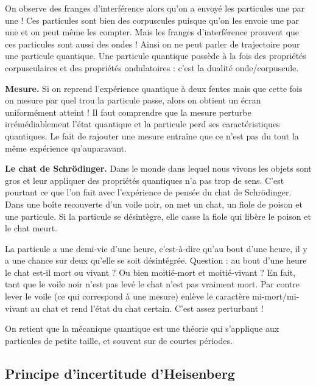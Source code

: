 \documentclass[11pt,class=report,crop=false]{standalone}
\begin{document}
On observe des franges d'interférence alors qu'on a envoyé les particules une par une !
Ces particules sont bien des corpuscules puisque qu'on les envoie une par une et on peut même les compter. Mais les franges d'interférence prouvent que ces particules sont aussi des ondes ! Ainsi on ne peut parler de trajectoire pour une particule quantique. Une particule quantique possède à la fois des propriétés corpusculaires et des propriétés ondulatoires : c'est la \og{}dualité onde/corpuscule\fg{}.

\bigskip

\textbf{Mesure.} 
Si on reprend l'expérience quantique à deux fentes mais que cette fois on mesure par quel trou la particule passe, alors on obtient un écran uniformément atteint !
Il faut comprendre que la mesure perturbe irrémédiablement l'état quantique et la particule perd ses caractéristiques quantiques. Le fait de rajouter une mesure entraîne que ce n'est pas du tout la même expérience qu'auparavant.


\bigskip

\textbf{Le chat de Schrödinger.}
Dans le monde dans lequel nous vivons les objets sont \og{}gros\fg{} et leur appliquer des propriétés quantiques n'a pas trop de sens. C'est pourtant ce que l'on fait avec l'expérience de pensée du chat de Schrödinger. Dans une boîte recouverte d'un voile noir, on met un chat, un fiole de poison et une particule. 
Si la particule se désintègre, elle casse la fiole qui libère le poison et le chat meurt.



La particule a une demi-vie d'une heure, c'est-à-dire qu'au bout d'une heure, il y a une chance sur deux qu'elle se soit désintégrée. 
Question : au bout d'une heure le chat est-il mort ou vivant ? Ou bien moitié-mort et moitié-vivant ? 
En fait, tant que le voile noir n'est pas levé le chat n'est pas vraiment mort. Par contre lever le voile (ce qui correspond à une mesure) enlève le caractère mi-mort/mi-vivant au chat et rend l'état du chat certain.
C'est assez perturbant ! 

On retient que la mécanique quantique est une théorie qui s'applique aux particules de petite taille, et souvent sur de courtes périodes.


\subsection{Principe d'incertitude d'Heisenberg}
\end{document}
